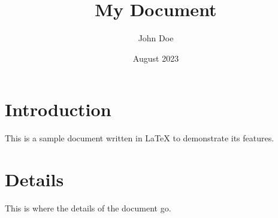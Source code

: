 \documentclass{article}
\title{My Document}
\author{John Doe}
\date{August 2023}
\begin{document}
\maketitle


\section{Introduction}
This is a sample document written in LaTeX to demonstrate its features.


\section{Details}
This is where the details of the document go.
\end{document}
